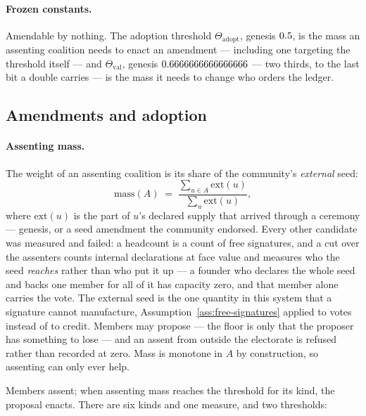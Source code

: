 \paragraph{Frozen constants.} Amendable by nothing. The adoption threshold
$\Theta_{\mathrm{adopt}}$, genesis $0.5$, is the mass an assenting coalition
needs to enact an amendment --- including one targeting the threshold itself --- and
$\Theta_{\mathrm{val}}$, genesis $0.6666666666666666$ --- two thirds, to the last
bit a double carries --- is the mass it needs to change who orders the ledger.

\subsection{Amendments and adoption}

\paragraph{Assenting mass.} The weight of an assenting coalition is its share of the
community's \emph{external} seed:
\[
  \mathrm{mass}(A) \;=\; \frac{\sum_{u \in A} \mathrm{ext}(u)}{\sum_{u} \mathrm{ext}(u)},
\]
where $\mathrm{ext}(u)$ is the part of $u$'s declared supply that arrived through a
ceremony --- genesis, or a seed amendment the community endorsed. Every other candidate
was measured and failed: a headcount is a count of free signatures, and a cut over the
assenters counts internal declarations at face value and measures who the seed
\emph{reaches} rather than who put it up --- a founder who declares the whole seed and
backs one member for all of it has capacity zero, and that member alone carries the vote.
The external seed is the one quantity in this system that a signature cannot manufacture,
Assumption~\ref{ass:free-signatures} applied to votes instead of to credit. Members may
propose --- the floor is only that the proposer has something to lose --- and an assent
from outside the electorate is refused rather than recorded at zero. Mass is monotone in
$A$ by construction, so assenting can only ever help.

Members assent; when assenting mass reaches the threshold for its kind, the proposal
enacts. There are six kinds and one measure, and two thresholds:


